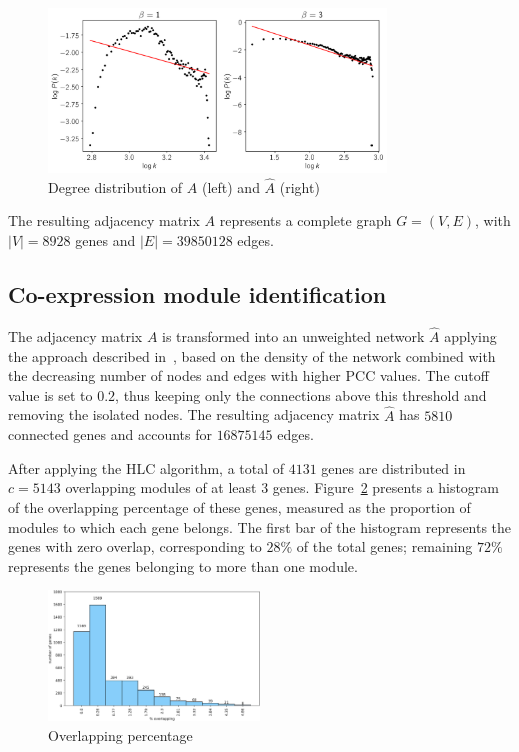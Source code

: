 \begin{figure}[htpb]
  \centering
    \includegraphics[clip,width=0.8\textwidth]{figures/pick_beta.png}
  \caption{Degree distribution of $A$ (left) and $\hat{A}$ (right)}
  \label{fig:beta}
\end{figure}

The resulting adjacency matrix $A$ represents a complete graph
$G=(V,E)$, with $|V| = 8928$ genes and $|E| = 39850128$ edges.

\subsection{Co-expression module identification}

The adjacency matrix $A$ is transformed into an unweighted network 
$\hat{A}$ applying the approach described in~\cite{aoki2007approaches}, 
based on the density of the network combined with the decreasing number
of nodes and edges with higher PCC values. The cutoff value is set to $0.2$,
thus keeping only the connections above this threshold and removing the 
isolated nodes. The resulting adjacency matrix $\hat{A}$ has $5810$ connected 
genes and accounts for $16875145$ edges.

After applying the HLC algorithm, a total of $4131$ genes are
distributed in $c = 5143$ overlapping modules of at least $3$ genes. Figure~\ref{fig:overlap} presents a histogram of the overlapping
percentage of these genes, measured as the proportion of modules to
which each gene belongs. The first bar of the histogram represents the
genes with zero overlap, corresponding to $28\%$ of the total
genes; remaining $72\%$ represents the genes belonging to more than one
module.

\begin{figure}[htpb]
  \centering
    \includegraphics[clip,width=0.5\textwidth]{figures/artificial_modules.png}
  \caption{Overlapping percentage}
  \label{fig:overlap}
\end{figure}


